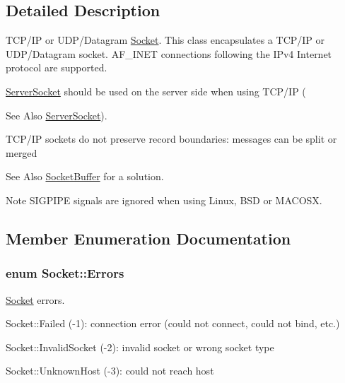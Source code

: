 \subsection{Detailed Description}
T\-C\-P/\-I\-P or U\-D\-P/\-Datagram \hyperlink{classSocket}{Socket}. This class encapsulates a T\-C\-P/\-I\-P or U\-D\-P/\-Datagram socket. A\-F\-\_\-\-I\-N\-E\-T connections following the I\-Pv4 Internet protocol are supported. 

\hyperlink{classServerSocket}{Server\-Socket} should be used on the server side when using T\-C\-P/\-I\-P (\begin{DoxySeeAlso}{See Also}
\hyperlink{classServerSocket}{Server\-Socket}).
\end{DoxySeeAlso}
T\-C\-P/\-I\-P sockets do not preserve record boundaries\-: messages can be split or merged \begin{DoxySeeAlso}{See Also}
\hyperlink{classSocketBuffer}{Socket\-Buffer} for a solution.
\end{DoxySeeAlso}
\begin{DoxyNote}{Note}
S\-I\-G\-P\-I\-P\-E signals are ignored when using Linux, B\-S\-D or M\-A\-C\-O\-S\-X. 
\end{DoxyNote}


\subsection{Member Enumeration Documentation}
\hypertarget{classSocket_a9f68308228badcdd299cd83e62e36976}{
\subsubsection[{Errors}]{\setlength{\rightskip}{0pt plus 5cm}enum {\bf Socket\-::\-Errors}}}\label{classSocket_a9f68308228badcdd299cd83e62e36976}


\hyperlink{classSocket}{Socket} errors. 


\begin{DoxyItemize}
\item Socket\-::\-Failed (-\/1)\-: connection error (could not connect, could not bind, etc.)
\item Socket\-::\-Invalid\-Socket (-\/2)\-: invalid socket or wrong socket type
\item Socket\-::\-Unknown\-Host (-\/3)\-: could not reach host 
\end{DoxyItemize}


